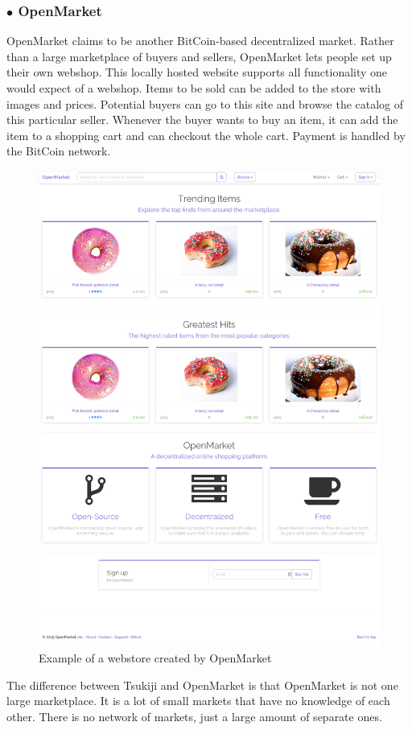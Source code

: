 \subsubsection*{$\bullet$ OpenMarket}
OpenMarket \cite{openmarket} claims to be another BitCoin-based decentralized market.
Rather than a large marketplace of buyers and sellers, OpenMarket lets people set up their own webshop.
This locally hosted website supports all functionality one would expect of a webshop.
Items to be sold can be added to the store with images and prices. 
Potential buyers can go to this site and browse the catalog of this particular seller.
Whenever the buyer wants to buy an item, it can add the item to a shopping cart and can checkout the whole cart.
Payment is handled by the BitCoin network.
\begin{figure}[H]
  \centering
  \includegraphics[scale=0.2]{openmarket}
  \caption{Example of a webstore created by OpenMarket\cite{opemarketpic}}
  \label{openmarketfig}
\end{figure}
The difference between Tsukiji and OpenMarket is that OpenMarket is not one large marketplace.
It is a lot of small markets that have no knowledge of each other.
There is no network of markets, just a large amount of separate ones.


